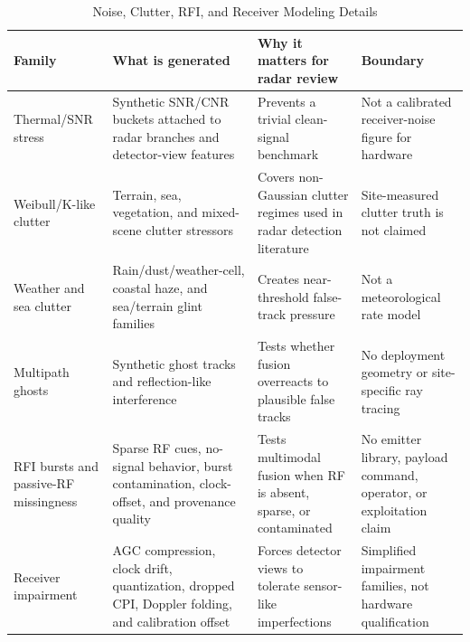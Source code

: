 \begin{table}[t]
  \caption{Noise, Clutter, RFI, and Receiver Modeling Details}
  \label{tab:noisemodeling}
  \centering
  \small
  \begin{tabular}{@{}p{}p{}p{}p{}@{}}
    \toprule
    Family & What is generated & Why it matters for radar review & Boundary \\
    \midrule
    Thermal/SNR stress & Synthetic SNR/CNR buckets attached to radar branches and detector-view features & Prevents a trivial clean-signal benchmark & Not a calibrated receiver-noise figure for hardware \\
    Weibull/K-like clutter & Terrain, sea, vegetation, and mixed-scene clutter stressors & Covers non-Gaussian clutter regimes used in radar detection literature & Site-measured clutter truth is not claimed \\
    Weather and sea clutter & Rain/dust/weather-cell, coastal haze, and sea/terrain glint families & Creates near-threshold false-track pressure & Not a meteorological rate model \\
    Multipath ghosts & Synthetic ghost tracks and reflection-like interference & Tests whether fusion overreacts to plausible false tracks & No deployment geometry or site-specific ray tracing \\
    RFI bursts and passive-RF missingness & Sparse RF cues, no-signal behavior, burst contamination, clock-offset, and provenance quality & Tests multimodal fusion when RF is absent, sparse, or contaminated & No emitter library, payload command, operator, or exploitation claim \\
    Receiver impairment & AGC compression, clock drift, quantization, dropped CPI, Doppler folding, and calibration offset & Forces detector views to tolerate sensor-like imperfections & Simplified impairment families, not hardware qualification \\
    \bottomrule
  \end{tabular}
\end{table}

